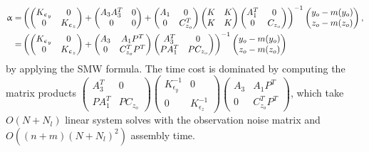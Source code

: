 \documentclass[article,ij4uq]{ij4uq}              %
\begin{document}
\begin{algorithm}[h!]
\begin{align}
    \alpha=&\left(\begin{pmatrix}K_{\epsilon_{y}}&0\\0&K_{\epsilon_{z}}\end{pmatrix}+\begin{pmatrix}A_{3}A_{3}^{T}&0\\0&0\end{pmatrix}+\begin{pmatrix}A_{1}&0\\0&C_{z_{o}}^{T}\end{pmatrix}\begin{pmatrix}K&K\\K&K\end{pmatrix}\begin{pmatrix}A_{1}^{T}&0\\0&C_{z_{o}}\end{pmatrix}\right)^{-1}\begin{pmatrix}y_{o}-m(y_{o})\\z_{o}-m(z_{o})\end{pmatrix},\notag\\
    =&\left(\begin{pmatrix}K_{\epsilon_{y}}&0\\0&K_{\epsilon_{z}}\end{pmatrix}+\begin{pmatrix}A_{3}&A_{1}P^{T}\\0&C_{z_{o}}^{T}P^{T}\end{pmatrix}\begin{pmatrix}A_{3}^{T}&0\\PA_{1}^{T}&PC_{z_{o}}\end{pmatrix}\right)^{-1}\begin{pmatrix}y_{o}-m(y_{o})\\z_{o}-m(z_{o})\end{pmatrix}
\end{align}
by applying the SMW formula. The time cost is dominated by computing the matrix products $\begin{pmatrix}A_{3}^{T}&0\\PA_{1}^{T}&PC_{z_{o}}\end{pmatrix}\begin{pmatrix}K_{\epsilon_{y}}^{-1}&0\\0&K_{\epsilon_{z}}^{-1}\end{pmatrix}\begin{pmatrix}A_{3}&A_{1}P^{T}\\0&C_{z_{o}}^{T}P^{T}\end{pmatrix}$, which take $O(N+N_{l})$ linear system solves with the observation noise matrix  and $O((n+m)(N+N_{l})^{2})$ assembly time.\\

\end{algorithm}
\end{document}
